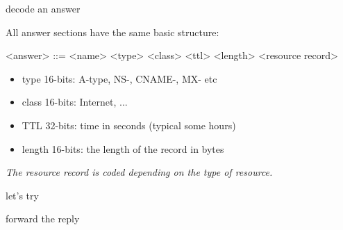 \begin{frame}[fragile]{decode an answer}

All answer sections have the same basic structure:

\begin{grammar}
<answer> ::= <name> <type> <class> <ttl> <length> <resource record>
\end{grammar}

\begin{itemize}
\item type 16-bits: A-type, NS-, CNAME-, MX- etc
\item class 16-bits: Internet, ...
\item TTL 32-bits: time in seconds (typical some hours)
\item length 16-bits: the length of the record in bytes
\end{itemize}

\vspace{10pt}\pause
{\em The resource record is coded depending on the type of resource.}

\end{frame}


\begin{frame}{let's try}


\end{frame}

\begin{frame}{forward the reply}

\end{frame}





